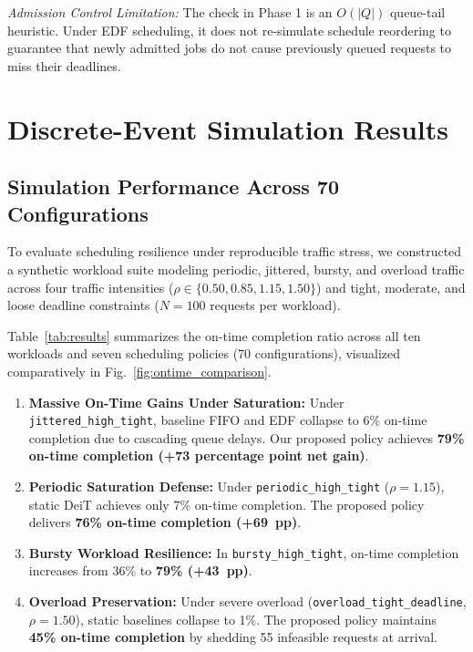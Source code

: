 \documentclass[conference]{IEEEtran}
\begin{document}
\textit{Admission Control Limitation:} The check in Phase 1 is an $O(|Q|)$ queue-tail heuristic. Under EDF scheduling, it does not re-simulate schedule reordering to guarantee that newly admitted jobs do not cause previously queued requests to miss their deadlines.

\section{Discrete-Event Simulation Results}

\subsection{Simulation Performance Across 70 Configurations}
To evaluate scheduling resilience under reproducible traffic stress, we constructed a synthetic workload suite modeling periodic, jittered, bursty, and overload traffic across four traffic intensities ($\rho \in \{0.50, 0.85, 1.15, 1.50\}$) and tight, moderate, and loose deadline constraints ($N=100$ requests per workload).

Table~\ref{tab:results} summarizes the on-time completion ratio across all ten workloads and seven scheduling policies (70 configurations), visualized comparatively in Fig.~\ref{fig:ontime_comparison}.
\begin{enumerate}
    \item \textbf{Massive On-Time Gains Under Saturation:} Under \texttt{jittered\_high\_tight}, baseline FIFO and EDF collapse to 6\% on-time completion due to cascading queue delays. Our proposed policy achieves \textbf{79\% on-time completion (+73 percentage point net gain)}.
    \item \textbf{Periodic Saturation Defense:} Under \texttt{periodic\_high\_tight} ($\rho=1.15$), static DeiT achieves only 7\% on-time completion. The proposed policy delivers \textbf{76\% on-time completion (+69~pp)}.
    \item \textbf{Bursty Workload Resilience:} In \texttt{bursty\_high\_tight}, on-time completion increases from 36\% to \textbf{79\% (+43~pp)}.
    \item \textbf{Overload Preservation:} Under severe overload (\texttt{overload\_tight\_deadline}, $\rho=1.50$), static baselines collapse to 1\%. The proposed policy maintains \textbf{45\% on-time completion} by shedding 55 infeasible requests at arrival.
\end{enumerate}
\end{document}
